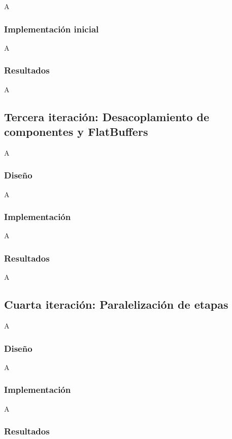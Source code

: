 A

\subsubsection*{Implementación inicial}

A

\subsubsection*{Resultados}

A

\subsection{Tercera iteración: Desacoplamiento de componentes y FlatBuffers}

A

\subsubsection*{Diseño}

A

\subsubsection*{Implementación}

A

\subsubsection*{Resultados}

A

\subsection{Cuarta iteración: Paralelización de etapas}

A

\subsubsection*{Diseño}

A

\subsubsection*{Implementación}

A

\subsubsection*{Resultados}

